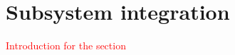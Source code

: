 \documentclass[main.tex]{subfiles}
\begin{document}


\section{Subsystem integration}
\textcolor{red}{Introduction for the section}



\end{document}
